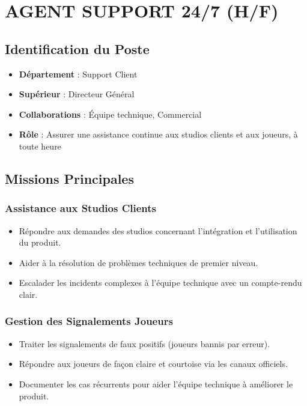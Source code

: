 \documentclass[12pt,a4paper]{article}
\begin{document}
\section{AGENT SUPPORT 24/7 (H/F)}

\subsection{Identification du Poste}
\begin{itemize}[label=\textbullet]
    \item \textbf{Département} : Support Client
    \item \textbf{Supérieur} : Directeur Général
    \item \textbf{Collaborations} : Équipe technique, Commercial
    \item \textbf{Rôle} : Assurer une assistance continue aux studios clients et aux joueurs, à toute heure
\end{itemize}

\subsection{Missions Principales}

\subsubsection{Assistance aux Studios Clients}
\begin{itemize}[label=\textbullet]
    \item Répondre aux demandes des studios concernant l'intégration et l'utilisation du produit.
    \item Aider à la résolution de problèmes techniques de premier niveau.
    \item Escalader les incidents complexes à l'équipe technique avec un compte-rendu clair.
\end{itemize}

\subsubsection{Gestion des Signalements Joueurs}
\begin{itemize}[label=\textbullet]
    \item Traiter les signalements de faux positifs (joueurs bannis par erreur).
    \item Répondre aux joueurs de façon claire et courtoise via les canaux officiels.
    \item Documenter les cas récurrents pour aider l'équipe technique à améliorer le produit.
\end{itemize}
\end{document}

